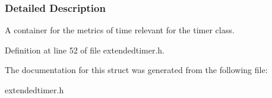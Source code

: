 \subsubsection{Detailed Description}
A container for the metrics of time relevant for the timer class. 

Definition at line 52 of file extendedtimer.h.



The documentation for this struct was generated from the following file:\begin{DoxyCompactItemize}
\item 
extendedtimer.h\end{DoxyCompactItemize}
